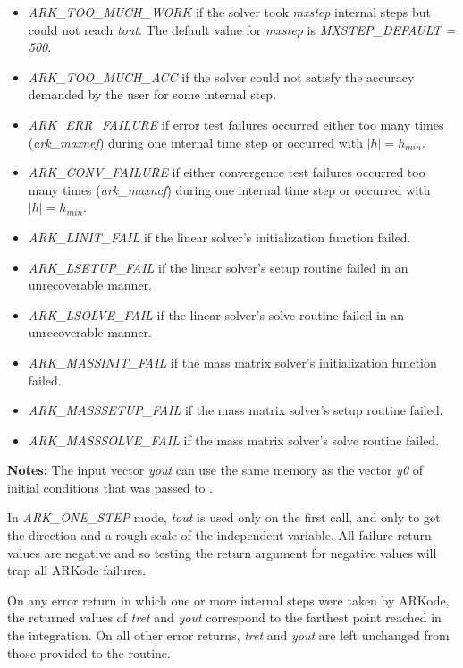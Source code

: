 \documentclass[letterpaper,10pt,english]{sphinxmanual}
\begin{document}
\begin{fulllineitems}
\begin{description}
\begin{itemize}
\item {} 
\emph{ARK\_TOO\_MUCH\_WORK} if the solver took \emph{mxstep} internal steps
but could not reach \emph{tout}.  The default value for \emph{mxstep} is
\emph{MXSTEP\_DEFAULT = 500}.

\item {} 
\emph{ARK\_TOO\_MUCH\_ACC} if the solver could not satisfy the accuracy
demanded by the user for some internal step.

\item {} 
\emph{ARK\_ERR\_FAILURE} if error test failures occurred either too many
times (\emph{ark\_maxnef}) during one internal time step or occurred
with \(|h| = h_{min}\).

\item {} 
\emph{ARK\_CONV\_FAILURE} if either convergence test failures occurred
too many times (\emph{ark\_maxncf}) during one internal time step or
occurred with \(|h| = h_{min}\).

\item {} 
\emph{ARK\_LINIT\_FAIL} if the linear solver's initialization function failed.

\item {} 
\emph{ARK\_LSETUP\_FAIL} if the linear solver's setup routine failed in
an unrecoverable manner.

\item {} 
\emph{ARK\_LSOLVE\_FAIL} if the linear solver's solve routine failed in
an unrecoverable manner.

\item {} 
\emph{ARK\_MASSINIT\_FAIL} if the mass matrix solver's
initialization function failed.

\item {} 
\emph{ARK\_MASSSETUP\_FAIL} if the mass matrix solver's setup routine
failed.

\item {} 
\emph{ARK\_MASSSOLVE\_FAIL} if the mass matrix solver's solve routine
failed.

\end{itemize}

\end{description}

\textbf{Notes:} The input vector \emph{yout} can use the same memory as the
vector \emph{y0} of initial conditions that was passed to
{\hyperref[c_interface/User_callable:c.ARKodeInit]{\emph{}}}.

In \emph{ARK\_ONE\_STEP} mode, \emph{tout} is used only on the first call, and
only to get the direction and a rough scale of the independent
variable. All failure return values are negative and so testing the
return argument for negative values will trap all ARKode failures.

On any error return in which one or more internal steps were taken
by ARKode, the returned values of \emph{tret} and \emph{yout} correspond to
the farthest point reached in the integration.  On all other error
returns, \emph{tret} and \emph{yout} are left unchanged from those provided
to the routine.

\end{fulllineitems}
\end{document}
